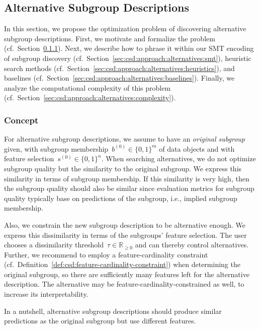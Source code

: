 \documentclass{article}
\theoremstyle{definition}
\begin{document}
\subsection{Alternative Subgroup Descriptions}
\label{sec:csd:approach:alternatives}

In this section, we propose the optimization problem of discovering alternative subgroup descriptions.
First, we motivate and formalize the problem (cf.~Section~\ref{sec:csd:approach:alternatives:concept}).
Next, we describe how to phrase it within our SMT encoding of subgroup discovery (cf.~Section~\ref{sec:csd:approach:alternatives:smt}), heuristic search methods (cf.~Section~\ref{sec:csd:approach:alternatives:heuristics}), and baselines (cf.~Section~\ref{sec:csd:approach:alternatives:baselines}).
Finally, we analyze the computational complexity of this problem (cf.~Section~\ref{sec:csd:approach:alternatives:complexity}).

\subsubsection{Concept}
\label{sec:csd:approach:alternatives:concept}

For alternative subgroup descriptions, we assume to have an \emph{original subgroup} given, with subgroup membership~$b^{(0)} \in \{0, 1\}^m$ of data objects and with feature selection~$s^{(0)} \in \{0, 1\}^n$.
When searching alternatives, we do not optimize subgroup quality but the similarity to the original subgroup.
We express this similarity in terms of subgroup membership.
If this similarity is very high, then the subgroup quality should also be similar since evaluation metrics for subgroup quality typically base on predictions of the subgroup, i.e., implied subgroup membership.

Also, we constrain the new subgroup description to be alternative enough.
We express this dissimilarity in terms of the subgroups' feature selection.
The user chooses a dissimilarity threshold~$\tau \in \mathbb{R}_{\geq 0}$ and can thereby control alternatives.
Further, we recommend to employ a feature-cardinality constraint (cf.~Definition~\ref{def:csd:feature-cardinality-constraint}) when determining the original subgroup, so there are sufficiently many features left for the alternative description.
The alternative may be feature-cardinality-constrained as well, to increase its interpretability.

In a nutshell, alternative subgroup descriptions should produce similar predictions as the original subgroup but use different features.
\end{document}
